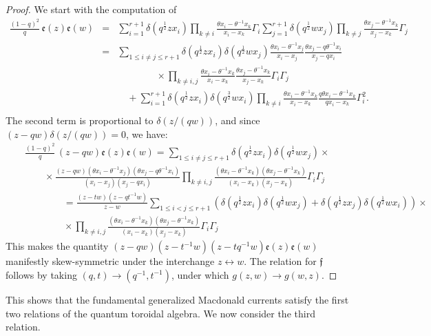 \begin{proof}
We start with the computation of
\begin{eqnarray*}
\frac{(1-q)^2}{q}\, {\mathfrak e}(z){\mathfrak e}(w)&=&\sum_{i=1}^{r+1} \delta(q^{\frac{1}{2}}z x_i)\prod_{k\neq i}\frac{\theta x_i-\theta^{-1}x_k}{x_i-x_k}\Gamma_i \sum_{j=1}^{r+1} \delta(q^{\frac{1}{2}}w x_j)\prod_{k\neq j}\frac{\theta x_j-\theta^{-1}x_k}{x_j-x_k}\Gamma_j\\
&=&\sum_{1\leq i\neq j\leq r+1}\delta(q^{\frac{1}{2}}z x_i)\delta(q^{\frac{1}{2}}w x_j)\frac{\theta x_i-\theta^{-1}x_j}{x_i-x_j}
\frac{\theta x_j-q\theta^{-1}x_i}{x_j-qx_i}\\
&&\qquad\qquad \times
\prod_{k\neq i,j} \frac{\theta x_i-\theta^{-1}x_k}{x_i-x_k}\frac{\theta x_j-\theta^{-1}x_k}{x_j-x_k}\Gamma_i\Gamma_j\\
&&\quad +\sum_{i=1}^{r+1}\delta(q^{\frac{1}{2}}z x_i)\delta(q^{\frac{3}{2}} w x_i)\prod_{k\neq i} \frac{\theta x_i-\theta^{-1}x_k}{x_i-x_k}\frac{q\theta x_i-\theta^{-1}x_k}{q x_i-x_k}\Gamma_i^2.\\
\end{eqnarray*}
The second term is proportional to $\delta(z/(q w))$, and since $(z-q w)\delta(z/(q w))=0$, we have:
\begin{eqnarray}
&&\frac{(1-q)^2}{q}\,(z-q w){\mathfrak e}(z){\mathfrak e}(w)=\sum_{1\leq i\neq j\leq r+1} \delta(q^{\frac{1}{2}}z x_i)\delta(q^{\frac{1}{2}}w x_j)\times \nonumber \\
&& \qquad \times \frac{(z-qw)(\theta x_i-\theta^{-1}x_j)(\theta x_j-q\theta^{-1}x_i)}{(x_i-x_j)(x_j-qx_i)}
\prod_{k\neq i,j} \frac{(\theta x_i-\theta^{-1}x_k)(\theta x_j-\theta^{-1}x_k)}{(x_i-x_k)(x_j-x_k)}\Gamma_i\Gamma_j
\nonumber \\
&&\qquad \qquad = \frac{(z-tw)(z-qt^{-1}w)}{z-w}\sum_{1\leq i<j\leq r+1} (\delta(q^{\frac{1}{2}}z x_i)\delta(q^{\frac{1}{2}}w x_j)+\delta(q^{\frac{1}{2}}z x_j)\delta(q^{\frac{1}{2}}w x_i))\times \nonumber \\
&&\qquad \qquad \times
\prod_{k\neq i,j}\frac{(\theta x_i-\theta^{-1}x_k)(\theta x_j-\theta^{-1}x_k)}{(x_i-x_k)(x_j-x_k)}\Gamma_i\Gamma_j
\label{pree}\end{eqnarray}
This makes the quantity $(z-q w)(z-t^{-1}w)(z-t q^{-1}w){\mathfrak e}(z){\mathfrak e}(w)$ 
manifestly skew-symmetric under the interchange $z\leftrightarrow w$.
The relation for ${\mathfrak f}$ follows by taking $(q,t)\to (q^{-1},t^{-1})$, under which $g(z,w)\to g(w,z)$.
\end{proof}
This shows that the fundamental generalized Macdonald currents satisfy the first two relations of the quantum toroidal algebra. We now consider the third relation.

